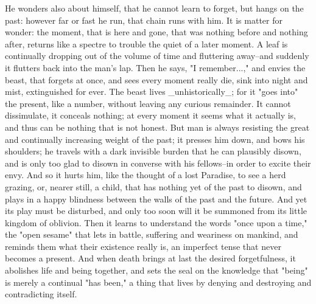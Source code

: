 He wonders also about himself, that he cannot learn to forget, but
hangs on the past: however far or fast he run, that chain runs with
him. It is matter for wonder: the moment, that is here and gone, that
was nothing before and nothing after, returns like a spectre to
trouble the quiet of a later moment. A leaf is continually dropping
out of the volume of time and fluttering away--and suddenly it
flutters back into the man's lap. Then he says, "I remember...," and
envies the beast, that forgets at once, and sees every moment really
die, sink into night and mist, extinguished for ever. The beast lives
_unhistorically_; for it "goes into" the present, like a number,
without leaving any curious remainder. It cannot dissimulate, it
conceals nothing; at every moment it seems what it actually is, and
thus can be nothing that is not honest. But man is always resisting
the great and continually increasing weight of the past; it presses
him down, and bows his shoulders; he travels with a dark invisible
burden that he can plausibly disown, and is only too glad to disown
in converse with his fellows--in order to excite their envy. And so
it hurts him, like the thought of a lost Paradise, to see a herd
grazing, or, nearer still, a child, that has nothing yet of the past
to disown, and plays in a happy blindness between the walls of the
past and the future. And yet its play must be disturbed, and only too
soon will it be summoned from its little kingdom of oblivion. Then it
learns to understand the words "once upon a time," the "open sesame"
that lets in battle, suffering and weariness on mankind, and reminds
them what their existence really is, an imperfect tense that never
becomes a present. And when death brings at last the desired
forgetfulness, it abolishes life and being together, and sets the
seal on the knowledge that "being" is merely a continual "has been,"
a thing that lives by denying and destroying and contradicting
itself.

